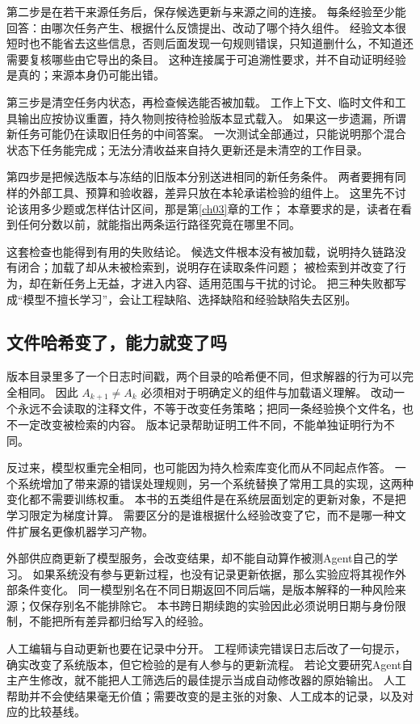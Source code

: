 第二步是在若干来源任务后，保存候选更新与来源之间的连接。
每条经验至少能回答：由哪次任务产生、根据什么反馈提出、改动了哪个持久组件。
经验文本很短时也不能省去这些信息，否则后面发现一句规则错误，只知道删什么，不知道还需要复核哪些由它导出的条目。
这种连接属于可追溯性要求，并不自动证明经验是真的；来源本身仍可能出错。

第三步是清空任务内状态，再检查候选能否被加载。
工作上下文、临时文件和工具输出应按协议重置，持久物则按待检验版本显式载入。
如果这一步遗漏，所谓新任务可能仍在读取旧任务的中间答案。
一次测试全部通过，只能说明那个混合状态下任务能完成；无法分清收益来自持久更新还是未清空的工作目录。

第四步是把候选版本与冻结的旧版本分别送进相同的新任务条件。
两者要拥有同样的外部工具、预算和验收器，差异只放在本轮承诺检验的组件上。
这里先不讨论该用多少题或怎样估计区间，那是第\ref{ch03}章的工作；
本章要求的是，读者在看到任何分数以前，就能指出两条运行路径究竟在哪里不同。

这套检查也能得到有用的失败结论。
候选文件根本没有被加载，说明持久链路没有闭合；加载了却从未被检索到，说明存在读取条件问题；
被检索到并改变了行为，却在新任务上无益，才进入内容、适用范围与干扰的讨论。
把三种失败都写成``模型不擅长学习''，会让工程缺陷、选择缺陷和经验缺陷失去区别。

\subsection{文件哈希变了，能力就变了吗}

版本目录里多了一个日志时间戳，两个目录的哈希便不同，但求解器的行为可以完全相同。
因此 $A_{k+1}\ne A_k$ 必须相对于明确定义的组件与加载语义理解。
改动一个永远不会读取的注释文件，不等于改变任务策略；把同一条经验换个文件名，也不一定改变被检索的内容。
版本记录帮助证明工件不同，不能单独证明行为不同。

反过来，模型权重完全相同，也可能因为持久检索库变化而从不同起点作答。
一个系统增加了带来源的错误处理规则，另一个系统替换了常用工具的实现，这两种变化都不需要训练权重。
本书的五类组件是在系统层面划定的更新对象，不是把学习限定为梯度计算。
需要区分的是谁根据什么经验改变了它，而不是哪一种文件扩展名更像机器学习产物。

外部供应商更新了模型服务，会改变结果，却不能自动算作被测Agent自己的学习。
如果系统没有参与更新过程，也没有记录更新依据，那么实验应将其视作外部条件变化。
同一模型别名在不同日期返回不同后端，是版本解释的一种风险来源；仅保存别名不能排除它。
本书跨日期续跑的实验因此必须说明日期与身份限制，不能把所有差异都归给写入的经验。

人工编辑与自动更新也要在记录中分开。
工程师读完错误日志后改了一句提示，确实改变了系统版本，但它检验的是有人参与的更新流程。
若论文要研究Agent自主产生修改，就不能把人工筛选后的最佳提示当成自动修改器的原始输出。
人工帮助并不会使结果毫无价值；需要改变的是主张的对象、人工成本的记录，以及对应的比较基线。

